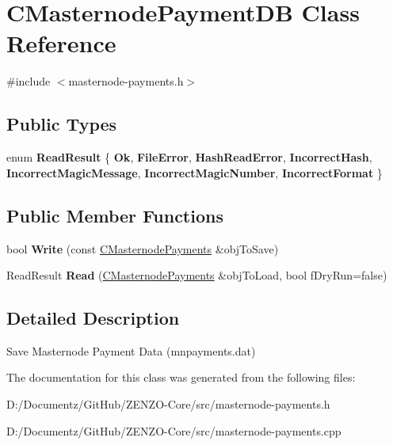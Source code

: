 \hypertarget{class_c_masternode_payment_d_b}{}\section{C\+Masternode\+Payment\+DB Class Reference}
\label{class_c_masternode_payment_d_b}


{\ttfamily \#include $<$masternode-\/payments.\+h$>$}

\subsection*{Public Types}
\begin{DoxyCompactItemize}
\item 
\mbox{\label{class_c_masternode_payment_d_b_acfe5000604cd3e49a896fc222fadeb5e}} 
enum {\bfseries Read\+Result} \{ \newline
{\bfseries Ok}, 
{\bfseries File\+Error}, 
{\bfseries Hash\+Read\+Error}, 
{\bfseries Incorrect\+Hash}, 
\newline
{\bfseries Incorrect\+Magic\+Message}, 
{\bfseries Incorrect\+Magic\+Number}, 
{\bfseries Incorrect\+Format}
 \}
\end{DoxyCompactItemize}
\subsection*{Public Member Functions}
\begin{DoxyCompactItemize}
\item 
\mbox{\label{class_c_masternode_payment_d_b_abf4ab2342aa350936b99b8d04ec2554d}} 
bool {\bfseries Write} (const \mbox{\hyperlink{class_c_masternode_payments}{C\+Masternode\+Payments}} \&obj\+To\+Save)
\item 
\mbox{\label{class_c_masternode_payment_d_b_a5b6f77de6ff3a59ef49fe28d748ccefb}} 
Read\+Result {\bfseries Read} (\mbox{\hyperlink{class_c_masternode_payments}{C\+Masternode\+Payments}} \&obj\+To\+Load, bool f\+Dry\+Run=false)
\end{DoxyCompactItemize}


\subsection{Detailed Description}
Save Masternode Payment Data (mnpayments.\+dat) 

The documentation for this class was generated from the following files\+:\begin{DoxyCompactItemize}
\item 
D\+:/\+Documentz/\+Git\+Hub/\+Z\+E\+N\+Z\+O-\/\+Core/src/masternode-\/payments.\+h\item 
D\+:/\+Documentz/\+Git\+Hub/\+Z\+E\+N\+Z\+O-\/\+Core/src/masternode-\/payments.\+cpp\end{DoxyCompactItemize}

